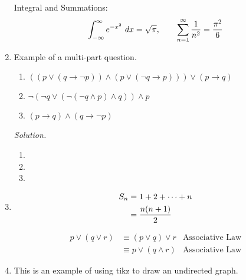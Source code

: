 \documentclass[11pt]{article}
\begin{document}
\begin{enumerate}
Integral and Summations:
$$\int_{-\infty}^{\infty}e^{-x^2}\ dx = \sqrt{\pi},\quad \quad \sum_{n=1}^{\infty}{1\over n^2}={\pi^2 \over 6}$$

    \clearpage
    \item Example of a multi-part question.

    \begin{enumerate}[label=(\alph*)]
        \item $((p \lor (q \rightarrow \neg p))\land (p\lor(\neg q\rightarrow p))) \lor (p\rightarrow q)$
        \item $\neg(\neg q\lor (\neg(\neg q\land p)\land q))\land p$
        \item $(p\rightarrow q)\land(q\rightarrow\neg p)$
    \end{enumerate}

    \textit{Solution.}

    \begin{enumerate}[label=(\alph*)]
        \item 
        \item 
        \item 
    \end{enumerate}

    \clearpage
    \item 
    \begin{equation*}
        \begin{split}
            S_n &= 1+2+\cdots+n \\
            &= {n(n+1)\over 2}
        \end{split}
    \end{equation*}

    
    \begin{align*}
        p \lor (q \lor r) &\equiv (p \lor q) \lor r & \text{Associative Law}\\
        &\equiv p \lor (q \land r) & \text{Associative Law}
    \end{align*}

    \clearpage
    \item This is an example of using tikz to draw an undirected graph.
    

\end{enumerate}
\end{document}

